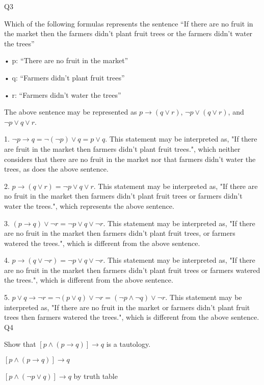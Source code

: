 \documentclass{article}
\begin{document}
Q3

Which of the following formulas represents the sentence “If there are no fruit in the market then the farmers didn’t plant fruit trees or the farmers didn’t water the trees”

• p: “There are no fruit in the market”

• q: “Farmers didn’t plant fruit trees”

• r: “Farmers didn’t water the trees”

The above sentence may be represented as \(p \rightarrow (q \lor r)\), \(\neg p \lor (q \lor r)\), and \(\neg p \lor q \lor r\).

1. \(\neg p \rightarrow q = \neg (\neg p) \lor q = p \lor q\). This statement may be interpreted as, "If there are fruit in the market then farmers didn't plant fruit trees.", which neither considers that there are no fruit in the market nor that farmers didn't water the trees, as does the above sentence.

2. \(p \rightarrow (q \lor r) = \neg p \lor q \lor r\). This statement may be interpreted as, "If there are no fruit in the market then farmers didn't plant fruit trees or farmers didn't water the trees.", which represents the above sentence.

3. \((p \rightarrow q) \lor \neg r = \neg p \lor q \lor \neg r\). This statement may be interpreted as, "If there are no fruit in the market then farmers didn't plant fruit trees, or farmers watered the trees.", which is different from the above sentence.

4. \(p \rightarrow (q \lor \neg r) = \neg p \lor q \lor \neg r\). This statement may be interpreted as, "If there are no fruit in the market then farmers didn't plant fruit trees or farmers watered the trees.", which is different from the above sentence.

5. \(p \lor q \rightarrow \neg r = \neg (p \lor q) \lor \neg r = (\neg p \land \neg q) \lor \neg r\). This statement may be interpreted as, "If there are no fruit in the market or farmers didn't plant fruit trees then farmers watered the trees.", which is different from the above sentence.\\

Q4

Show that \([p \land (p \rightarrow q)] \rightarrow q\) is a tautology.

\([p \land (p \rightarrow q)] \rightarrow q\)

\([p \land (\neg p \lor q)] \rightarrow q\) by truth table
\end{document}
